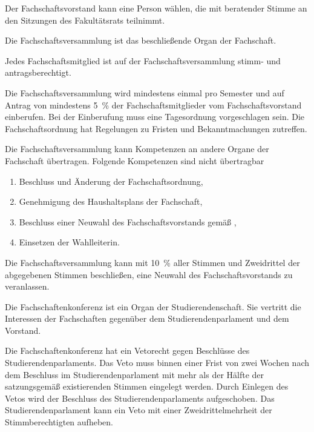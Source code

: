\begin{jurdoc}
Der Fachschaftsvorstand kann eine Person wählen, die mit beratender Stimme an den Sitzungen des Fakultätsrats teilnimmt.


\label{fachschaft:vv}

Die Fachschaftsversammlung ist das beschließende Organ der Fachschaft.

Jedes Fachschaftsmitglied ist auf der Fachschaftsversammlung stimm- und antragsberechtigt.

Die Fachschaftsversammlung wird mindestens einmal pro Semester und auf Antrag von mindestens 5~\% der Fach\-schaftsmitglieder vom Fachschaftsvorstand einberufen. Bei der Einberufung muss eine Tagesordnung vorgeschlagen sein. Die Fachschaftsordnung hat Regelungen zu Fristen und Bekanntmachungen zutreffen.

Die Fachschaftsversammlung kann Kompetenzen an andere Organe der Fachschaft übertragen. Folgende Kompetenzen sind nicht übertragbar \label{fachschaft:vv:kompetenzen}
  \begin{enumerate}
  \item Beschluss und Änderung der Fachschaftsordnung,
  \item Genehmigung des Haushaltsplans der Fachschaft,
  \item Beschluss einer Neuwahl des Fachschaftsvorstands gemäß , \label{fachschaft:vv:kompetenzen:abwahl}
  \item Einsetzen der Wahlleiterin.\label{fachschaft:vv:wahlleiter}
  \end{enumerate}

Die Fachschaftsversammlung kann mit 10~\% aller Stimmen und Zweidrittel der abgegebenen Stimmen be\-schlie\-ßen, eine Neuwahl des Fach\-schaftsvor\-stands zu veranlassen\label{fachschaft:vv:wahl}.

%
%


 \label{fsk:aufgaben}

Die Fachschaftenkonferenz ist ein Organ der Studierendenschaft. Sie vertritt die Interessen der Fachschaften  gegenüber dem Studierendenparlament und dem Vorstand.

Die Fachschaftenkonferenz hat ein Vetorecht gegen Beschlüsse des Studierendenparlaments. Das Veto muss binnen einer Frist von zwei Wochen nach dem Beschluss im Studierendenparlament mit mehr als der Hälfte der satzungsgemäß existierenden Stimmen eingelegt werden. Durch Einlegen des Vetos wird der Beschluss des Studierendenparlaments aufgeschoben. Das Studierendenparlament kann ein Veto mit einer Zweidrittelmehrheit der Stimmberechtigten aufheben.\label{fsk:aufgaben:einspruch}


\end{jurdoc}
